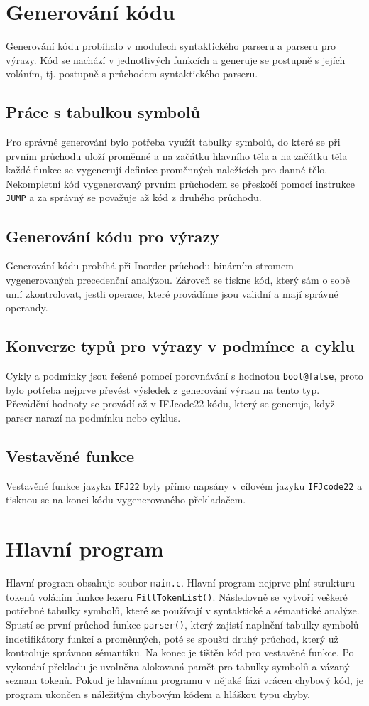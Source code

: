 \documentclass[11pt,a4paper]{article}
\begin{document}
\pagebreak{}

\section{Generování kódu}
Generování kódu probíhalo v modulech syntaktického parseru a parseru pro výrazy. Kód se nachází v jednotlivých funkcích a generuje se postupně s jejích voláním, tj. postupně s průchodem syntaktického parseru.
\subsection{Práce s tabulkou symbolů}
Pro správné generování bylo potřeba využít tabulky symbolů, do které se při prvním průchodu uloží proměnné a na začátku hlavního těla a na začátku těla každé funkce se vygenerují definice proměnných naležících pro danné tělo. Nekompletní kód vygenerovaný prvním průchodem se přeskočí pomocí instrukce \verb|JUMP| a za správný se považuje až kód z druhého průchodu.
\subsection{Generování kódu pro výrazy}
Generování kódu probíhá při Inorder průchodu binárním stromem vygenerovaných precedenční analýzou. Zároveň se tiskne kód, který sám o sobě umí zkontrolovat, jestli operace, které provádíme jsou validní a mají správné operandy. 
\subsection{Konverze typů pro výrazy v podmínce a cyklu}
Cykly a podmínky jsou řešené pomocí porovnávání s hodnotou \verb|bool@false|, proto bylo potřeba nejprve převést výsledek z generování výrazu na tento typ. Převádění hodnoty se provádí až v IFJcode22 kódu, který se generuje, když parser narazí na podmínku nebo cyklus.
    
\subsection{Vestavěné funkce}
Vestavěné funkce jazyka \verb|IFJ22| byly přímo napsány v cílovém jazyku \verb|IFJcode22| a tisknou se na konci kódu vygenerovaného překladačem.

\pagebreak{}

\section{Hlavní program}
Hlavní program obsahuje soubor \verb|main.c|. Hlavní program nejprve plní strukturu tokenů voláním funkce lexeru \verb|FillTokenList()|.
Následovně se vytvoří veškeré potřebné tabulky symbolů, které se používají v syntaktické a sémantické analýze. Spustí se první průchod funkce \verb|parser()|,
který zajistí naplnění tabulky symbolů indetifikátory funkcí a proměnných, poté se spouští druhý průchod, který už kontroluje správnou sémantiku.
Na konec je tištěn kód pro vestavěné funkce. Po vykonání překladu je uvolněna alokovaná pamět pro tabulky symbolů a vázaný seznam tokenů.
Pokud je hlavnímu programu v nějaké fázi vrácen chybový kód, je program ukončen s náležitým chybovým kódem a hláškou typu chyby.
\end{document}
